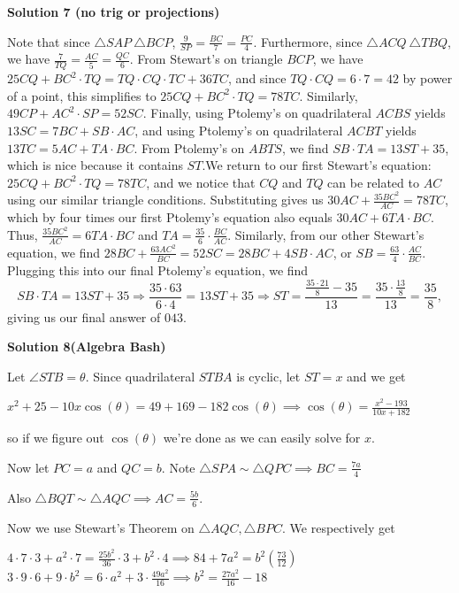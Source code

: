 \begin{enumerate}
\textbf{Solution 7 (no trig or projections)}

Note that since $\triangle SAP~\triangle BCP$, $\frac{9}{SP}=\frac{BC}{7}=\frac{PC}{4}$. Furthermore, since $\triangle ACQ~\triangle TBQ$, we have $\frac{7}{TQ}=\frac{AC}{5}=\frac{QC}{6}$. From Stewart's on triangle $BCP$, we have $25CQ+BC^2\cdot TQ=TQ\cdot CQ\cdot TC+36TC$, and since $TQ\cdot CQ=6\cdot7=42$ by power of a point, this simplifies to $25CQ+BC^2\cdot TQ=78TC$. Similarly, $49CP+AC^2\cdot SP=52SC$. Finally, using Ptolemy's on quadrilateral $ACBS$ yields $13SC=7BC+SB\cdot AC$, and using Ptolemy's on quadrilateral $ACBT$ yields $13TC=5AC+TA\cdot BC$. From Ptolemy's on $ABTS$, we find $SB\cdot TA=13ST+35$, which is nice because it contains $ST$.We return to our first Stewart's equation: $25CQ+BC^2\cdot TQ=78TC$, and we notice that $CQ$ and $TQ$ can be related to $AC$ using our similar triangle conditions. Substituting gives us $30AC+\frac{35BC^2}{AC}=78TC$, which by four times our first Ptolemy's equation also equals $30AC+6TA\cdot BC$. Thus, $\frac{35BC^2}{AC}=6TA\cdot BC$ and $TA=\frac{35}{6}\cdot\frac{BC}{AC}$. Similarly, from our other Stewart's equation, we find $28BC+\frac{63AC^2}{BC}=52SC=28BC+4SB\cdot AC$, or $SB=\frac{63}{4}\cdot\frac{AC}{BC}$. Plugging this into our final Ptolemy's equation, we find 
 \[SB\cdot TA=13ST+35\Longrightarrow\frac{35\cdot63}{6\cdot4}=13ST+35\Longrightarrow ST=\frac{\frac{35\cdot21}{8}-35}{13}=\frac{35\cdot\frac{13}{8}}{13}=\frac{35}{8},\]giving us our final answer of $\boxed{043}$.

 



\textbf{Solution 8(Algebra Bash)}

Let $\angle STB = \theta$. Since quadrilateral $STBA$ is cyclic, let $ST = x$ and we get

 $x^2 + 25 - 10x \cos(\theta) = 49 + 169 - 182 \cos(\theta) \implies \cos(\theta) = \frac{x^2 - 193}{10x + 182}$

 so if we figure out $\cos(\theta)$ we're done as we can easily solve for $x$. 

 Now let $PC = a$ and $QC = b$. Note $\triangle SPA \sim \triangle QPC \implies BC = \frac{7a}{4}$

 Also $\triangle BQT \sim \triangle AQC \implies AC = \frac{5b}{6}$. 

 Now we use Stewart's Theorem on $\triangle AQC, \triangle BPC$. We respectively get

 $4 \cdot 7 \cdot 3 + a^2 \cdot 7 = \frac{25b^2}{36} \cdot 3 + b^2 \cdot 4 \implies 84 + 7a^2 = b^2(\frac{73}{12})$
$3 \cdot 9 \cdot 6 + 9 \cdot b^2 = 6 \cdot a^2 + 3 \cdot \frac{49a^2}{16} \implies b^2 = \frac{27a^2}{16} - 18$


\end{enumerate}
